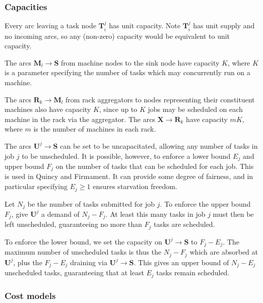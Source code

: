 \subsubsection{Capacities}

Every arc leaving a task node $\mathbf{T}_i^j$ has unit capacity. Note $\mathbf{T}_i^j$ has unit supply and no incoming arcs, so any (non-zero) capacity would be equivalent to unit capacity.

The arcs $\mathbf{M}_l \to \mathbf{S}$ from machine nodes to the sink node have capacity $K$, where $K$ is a parameter specifying the number of tasks which may concurrently run on a machine\footnotemark.

The arcs $\mathbf{R}_k \to \mathbf{M}_l$ from rack aggregators to nodes representing their constituent machines also have capacity $K$, since up to $K$ jobs may be scheduled on each machine in the rack via the aggregator. The arcs $\mathbf{X} \to \mathbf{R}_k$ have capacity $mK$, where $m$ is the number of machines in each rack.

The arcs $\mathbf{U}^j \to \mathbf{S}$ can be set to be uncapacitated, allowing any number of tasks in job $j$ to be unscheduled. It is possible, however, to enforce a lower bound $E_j$ and upper bound $F_j$ on the number of tasks that can be scheduled for each job. This is used in Quincy and Firmament. It can provide some degree of fairness, and in particular specifying $E_j \geq 1$ ensures starvation freedom.

Let $N_j$ be the number of tasks submitted for job $j$. To enforce the upper bound $F_j$, give $\mathbf{U}^j$ a demand of $N_j - F_j$. At least this many tasks in job $j$ must then be left unscheduled, guaranteeing no more than $F_j$ tasks are scheduled.

To enforce the lower bound, we set the capacity on $\mathbf{U}^j \to \mathbf{S}$ to $F_j - E_j$. The maximum number of unscheduled tasks is thus the $N_j - F_j$ which are absorbed at $\mathbf{U}^j$, plus the $F_j - E_j$ draining via $\mathbf{U}^j \to \mathbf{S}$. This gives an upper bound of $N_j - E_j$ unscheduled tasks, guaranteeing that at least $E_j$ tasks remain scheduled.

\subsubsection{Cost models}  

